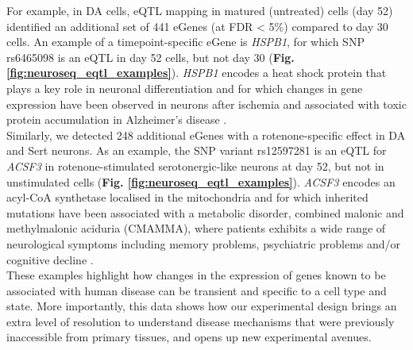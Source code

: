For example, in DA cells, eQTL mapping in matured (untreated) cells (day 52) identified an additional set of 441 eGenes (at FDR < 5\%) compared to day 30 cells.
An example of a timepoint-specific eGene is \textit{HSPB1}, for which SNP rs6465098 is an eQTL in day 52 cells, but not day 30 (\textbf{Fig. \ref{fig:neuroseq_eqtl_examples}}). 
\textit{HSPB1} encodes a heat shock protein that plays a key role in neuronal differentiation \cite{miller2018heat} and for which changes in gene expression have been observed in neurons after ischemia \cite{bartelt2016hspb5} and associated with toxic protein accumulation in Alzheimer's disease \cite{shimura2004binding, wilhelmus2006small}.\\

Similarly, we detected 248 additional eGenes with a rotenone-specific effect in DA and Sert neurons. 
As an example, the SNP variant rs12597281 is an eQTL for \textit{ACSF3} in rotenone-stimulated serotonergic-like neurons at day 52, but not in unstimulated cells (\textbf{Fig. \ref{fig:neuroseq_eqtl_examples}}). 
\textit{ACSF3} encodes an acyl-CoA synthetase localised in the mitochondria and for which inherited mutations have been associated with a metabolic disorder, combined malonic and methylmalonic aciduria (CMAMMA), where patients exhibits a wide range of neurological symptoms including memory problems, psychiatric problems and/or cognitive decline \cite{tucci2020brain}.\\

These examples highlight how changes in the expression of genes known to be associated with human disease can be transient and specific to a cell type and state. 
More importantly, this data shows how our experimental design brings an extra level of resolution to understand disease mechanisms that were previously inaccessible from primary tissues, and opens up new experimental avenues. \\



